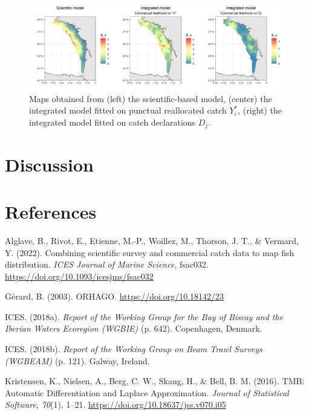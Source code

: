 \documentclass[
  english,
  man,floatsintext]{apa6}
\begin{document}
\begin{figure}
\centering
\includegraphics{images/case_study_plot.png}
\caption{\label{fig:CaseStudyMap} Maps obtained from (left) the scientific-based model, (center) the integrated model fitted on punctual reallocated catch \(Y_i^*\), (right) the integrated model fitted on catch declarations \(D_j\).}
\end{figure}

\hypertarget{discussion}{%
\section{Discussion}\label{discussion}}

\newpage

\hypertarget{references}{%
\section{References}\label{references}}

\begingroup
\setlength{\parindent}{-0.5in}
\setlength{\leftskip}{0.5in}

\hypertarget{refs}{}
\leavevmode\hypertarget{ref-alglave_combining_2022}{}%
Alglave, B., Rivot, E., Etienne, M.-P., Woillez, M., Thorson, J. T., \& Vermard, Y. (2022). Combining scientific survey and commercial catch data to map fish distribution. \emph{ICES Journal of Marine Science}, fsac032. \url{https://doi.org/10.1093/icesjms/fsac032}

\leavevmode\hypertarget{ref-biais_gerard_orhago_2003}{}%
Gérard, B. (2003). ORHAGO. \url{https://doi.org/10.18142/23}

\leavevmode\hypertarget{ref-ices_report_2018-1}{}%
ICES. (2018a). \emph{Report of the Working Group for the Bay of Biscay and the Iberian Waters Ecoregion (WGBIE)} (p. 642). Copenhagen, Denmark.

\leavevmode\hypertarget{ref-ices_report_2018}{}%
ICES. (2018b). \emph{Report of the Working Group on Beam Trawl Surveys (WGBEAM)} (p. 121). Galway, Ireland.

\leavevmode\hypertarget{ref-kristensen_tmb_2016}{}%
Kristensen, K., Nielsen, A., Berg, C. W., Skaug, H., \& Bell, B. M. (2016). TMB: Automatic Differentiation and Laplace Approximation. \emph{Journal of Statistical Software}, \emph{70}(1), 1--21. \url{https://doi.org/10.18637/jss.v070.i05}
\end{document}
